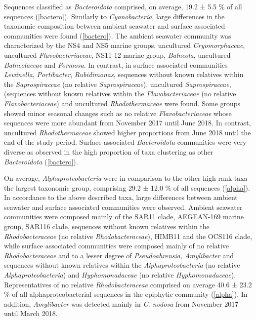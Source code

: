 \documentclass[
  12pt,
]{article}
\begin{document}
Sequences classified as \emph{Bacteroidota} comprised, on average, 19.2
± 5.5 \si{\percent} of all sequences (\autoref{bactero}). Similarly to
\emph{Cyanobacteria}, large differences in the taxonomic composition
between ambient seawater and surface associated communities were found
(\autoref{bactero}). The ambient seawater community was characterized by
the NS4 and NS5 marine groups, uncultured \emph{Cryomorphaceae},
uncultured \emph{Flavobacteriaceae}, NS11-12 marine group,
\emph{Balneola}, uncultured \emph{Balneolaceae} and \emph{Formosa}. In
contrast, in surface associated communities \emph{Lewinella},
\emph{Portibacter}, \emph{Rubidimonas}, sequences without known
relatives within the \emph{Saprospiraceae} (no relative
\emph{Saprospiraceae}), uncultured \emph{Saprospiraceae}, (sequences
without known relatives within the \emph{Flavobacteriaceae} (no relative
\emph{Flavobacteriaceae}) and uncultured \emph{Rhodothermaceae} were
found. Some groups showed minor seasonal changes such as no relative
\emph{Flavobacteriaceae} whose sequences were more abundant from
November 2017 until June 2018. In contrast, uncultured
\emph{Rhodothermaceae} showed higher proportions from June 2018 until
the end of the study period. Surface associated \emph{Bacteroidota}
communities were very diverse as observed in the high proportion of taxa
clustering as other \emph{Bacteroidota} (\autoref{bactero}).

On average, \emph{Alphaproteobacteria} were in comparison to the other
high rank taxa the largest taxonomic group, comprising 29.2 ± 12.0
\si{\percent} of all sequences (\autoref{alpha}). In accordance to the
above described taxa, large differences between ambient seawater and
surface associated communities were observed. Ambient seawater
communities were composed mainly of the SAR11 clade, AEGEAN-169 marine
group, SAR116 clade, sequences without known relatives within the
\emph{Rhodobacteraceae} (no relative \emph{Rhodobacteraceae}), HIMB11
and the OCS116 clade, while surface associated communities were composed
mainly of no relative \emph{Rhodobacteraceae} and to a lesser degree of
\emph{Pseudoahrensia}, \emph{Amylibacter} and sequences without known
relatives within the \emph{Alphaproteobacteria} (no relative
\emph{Alphaproteobacteria}) and \emph{Hyphomonadaceae} (no relative
\emph{Hyphomonadaceae}). Representatives of no relative
\emph{Rhodobacteraceae} comprised on average 40.6 ± 23.2 \si{\percent}
of all alphaproteobacterial sequences in the epiphytic community
(\autoref{alpha}). In addition, \emph{Amylibacter} was detected mainly
in \emph{C. nodosa} from November 2017 until March 2018.
\end{document}
